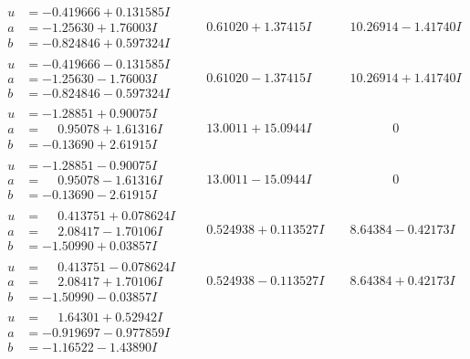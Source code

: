 \documentclass[1p]{elsarticle_modified}
\theoremstyle{definition}
\begin{document}
$$\begin{array}{c|c|c}
\begin{aligned}
u &= -0.419666 + 0.131585 I \\
a &= -1.25630 + 1.76003 I \\
b &= -0.824846 + 0.597324 I\end{aligned}
 & \phantom{-}0.61020 + 1.37415 I & \phantom{-}10.26914 - 1.41740 I \\ \hline\begin{aligned}
u &= -0.419666 - 0.131585 I \\
a &= -1.25630 - 1.76003 I \\
b &= -0.824846 - 0.597324 I\end{aligned}
 & \phantom{-}0.61020 - 1.37415 I & \phantom{-}10.26914 + 1.41740 I \\ \hline\begin{aligned}
u &= -1.28851 + 0.90075 I \\
a &= \phantom{-}0.95078 + 1.61316 I \\
b &= -0.13690 + 2.61915 I\end{aligned}
 & \phantom{-}13.0011 + 15.0944 I & \phantom{-0.000000 } 0 \\ \hline\begin{aligned}
u &= -1.28851 - 0.90075 I \\
a &= \phantom{-}0.95078 - 1.61316 I \\
b &= -0.13690 - 2.61915 I\end{aligned}
 & \phantom{-}13.0011 - 15.0944 I & \phantom{-0.000000 } 0 \\ \hline\begin{aligned}
u &= \phantom{-}0.413751 + 0.078624 I \\
a &= \phantom{-}2.08417 - 1.70106 I \\
b &= -1.50990 + 0.03857 I\end{aligned}
 & \phantom{-}0.524938 + 0.113527 I & \phantom{-}8.64384 - 0.42173 I \\ \hline\begin{aligned}
u &= \phantom{-}0.413751 - 0.078624 I \\
a &= \phantom{-}2.08417 + 1.70106 I \\
b &= -1.50990 - 0.03857 I\end{aligned}
 & \phantom{-}0.524938 - 0.113527 I & \phantom{-}8.64384 + 0.42173 I \\ \hline\begin{aligned}
u &= \phantom{-}1.64301 + 0.52942 I \\
a &= -0.919697 - 0.977859 I \\
b &= -1.16522 - 1.43890 I\end{aligned}

\end{array}$$
\end{document}
